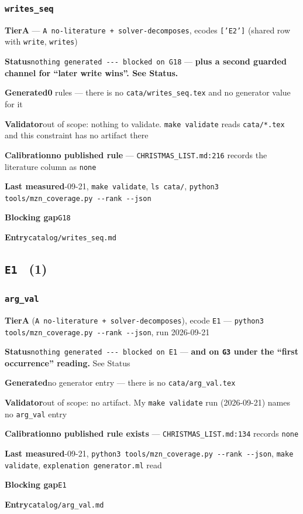 \documentclass[10pt,a4paper]{article}
\newcommand{\entryfield}[2]{{\raggedright\textbf{#1}\quad #2\par}}
\begin{document}
\subsubsection*{\texttt{writes\_\allowbreak{}seq}}
\label{entry:writes-seq}
\entryfield{Tier}{\textbf{A} --- \texttt{A no-\allowbreak{}literature + solver-\allowbreak{}decomposes}, ecodes \texttt{['E2']} (shared row with \texttt{write}, \texttt{writes})}
\entryfield{Status}{\texttt{nothing generated -\allowbreak{}-\allowbreak{}-\allowbreak{} blocked on G18} --- \textbf{plus a second guarded channel for ``later write wins''. See Status.}}
\entryfield{Generated}{\textbf{0} rules --- there is no \texttt{cata/writes\_seq.tex} and no generator value for it}
\entryfield{Validator}{out of scope: nothing to validate. \texttt{make validate} reads \texttt{cata/*.tex} and this constraint has no artifact there}
\entryfield{Calibration}{\textbf{no published rule} --- \texttt{CHRISTMAS\_LIST.md:216} records the literature column as \texttt{none}}
\entryfield{Last measured}{2026-09-21, \texttt{make validate}, \texttt{ls cata/}, \texttt{python3 tools/\allowbreak{}mzn\_\allowbreak{}coverage.\allowbreak{}py -\allowbreak{}-\allowbreak{}rank -\allowbreak{}-\allowbreak{}json}}
\entryfield{Blocking gap}{\texttt{G18}}
\entryfield{Entry}{\texttt{catalog/writes\_seq.md}}
\subsection*{\texttt{E1} \ \normalsize(1)}
\subsubsection*{\texttt{arg\_\allowbreak{}val}}
\label{entry:arg-val}
\entryfield{Tier}{\textbf{A} (\texttt{A no-\allowbreak{}literature + solver-\allowbreak{}decomposes}), ecode \texttt{E1} --- \texttt{python3 tools/\allowbreak{}mzn\_\allowbreak{}coverage.\allowbreak{}py -\allowbreak{}-\allowbreak{}rank -\allowbreak{}-\allowbreak{}json}, run 2026-09-21}
\entryfield{Status}{\texttt{nothing generated -\allowbreak{}-\allowbreak{}-\allowbreak{} blocked on E1} --- \textbf{and on \texttt{G3} under the ``first occurrence'' reading.} See Status}
\entryfield{Generated}{no generator entry --- there is no \texttt{cata/arg\_val.tex}}
\entryfield{Validator}{out of scope: no artifact. My \texttt{make validate} run (2026-09-21) names no \texttt{arg\_val} entry}
\entryfield{Calibration}{\textbf{no published rule exists} --- \texttt{CHRISTMAS\_LIST.md:134} records \texttt{none}}
\entryfield{Last measured}{2026-09-21, \texttt{python3 tools/\allowbreak{}mzn\_\allowbreak{}coverage.\allowbreak{}py -\allowbreak{}-\allowbreak{}rank -\allowbreak{}-\allowbreak{}json}, \texttt{make validate}, \texttt{explenation generator.ml} read}
\entryfield{Blocking gap}{\texttt{E1}}
\entryfield{Entry}{\texttt{catalog/arg\_val.md}}
\clearpage
\end{document}
